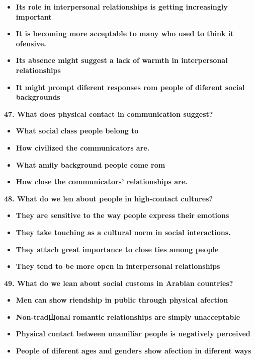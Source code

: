 \documentclass[UTF8,11pt]{ctexart}
\begin{document}
\begin{itemize}[leftmargin=2em,itemsep=.2em,topsep=.4em]\item[A.] \textbf{Its role in interpersonal relationships is getting increasingly important}
\item[B.] \textbf{It is becoming more acceptable to many who used to think it ofensive.}
\item[C.] \textbf{Its absence might suggest a lack of warmth in interpersonal relationships}
\item[D.] \textbf{It might prompt diferent responses rom people of diferent social backgrounds}
\end{itemize}

\textbf{47. What does physical contact in communication suggest?}


\begin{itemize}[leftmargin=2em,itemsep=.2em,topsep=.4em]\item[A.] \textbf{What social class people belong to}
\item[B.] \textbf{How civilized the communicators are.}
\item[C.] \textbf{What amily background people come rom}
\item[D.] \textbf{How close the communicators' relationships are.}
\end{itemize}

\textbf{48. What do we len about people in high-contact cultures?}


\begin{itemize}[leftmargin=2em,itemsep=.2em,topsep=.4em]\item[A.] \textbf{They are sensitive to the way people express their emotions}
\item[B.] \textbf{They take touching as a cultural norm in social interactions.}
\item[C.] \textbf{They attach great importance to close ties among people}
\item[D.] \textbf{They tend to be more open in interpersonal relationships}
\end{itemize}

\textbf{49. What do we lean about social customs in Arabian countries?}


\begin{itemize}[leftmargin=2em,itemsep=.2em,topsep=.4em]\item[A.] \textbf{Men can show riendship in public through physical afection}
\item[B.] \textbf{Non-trad山onal romantic relationships are simply unacceptable}
\item[C.] \textbf{Physical contact between unamiliar people is negatively perceived}
\item[D.] \textbf{People of diferent ages and genders show afection in diferent ways}
\end{itemize}
\end{document}
